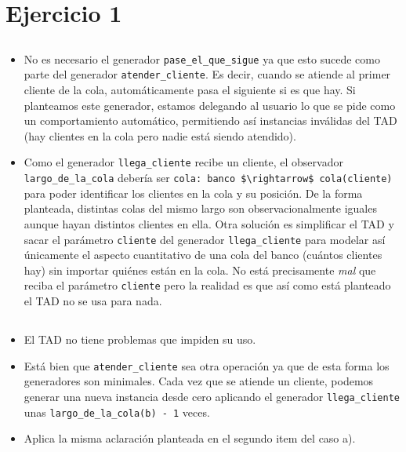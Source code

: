 \section{Ejercicio 1}

\subsection{}

\begin{itemize}
    \item No es necesario el generador \lstinline{pase_el_que_sigue} ya que esto sucede como parte del generador \lstinline{atender_cliente}. Es decir, cuando se atiende al primer cliente de la cola, automáticamente pasa el siguiente si es que hay. Si planteamos este generador, estamos delegando al usuario lo que se pide como un comportamiento automático, permitiendo así instancias inválidas del TAD (hay clientes en la cola pero nadie está siendo atendido).
    \item Como el generador \lstinline{llega_cliente} recibe un cliente, el observador \lstinline{largo_de_la_cola} debería ser \lstinline{cola: banco $\rightarrow$ cola(cliente)} para poder identificar los clientes en la cola y su posición. De la forma planteada, distintas colas del mismo largo son observacionalmente iguales aunque hayan distintos clientes en ella. Otra solución es simplificar el TAD y sacar el parámetro \lstinline{cliente} del generador \lstinline{llega_cliente} para modelar así únicamente el aspecto cuantitativo de una cola del banco (cuántos clientes hay) sin importar quiénes están en la cola. No está precisamente \emph{mal} que reciba el parámetro \lstinline{cliente} pero la realidad es que así como está planteado el TAD no se usa para nada.
\end{itemize}

\subsection{}

\begin{itemize}
    \item El TAD no tiene problemas que impiden su uso.
    \item Está bien que \lstinline{atender_cliente} sea otra operación ya que de esta forma los generadores son minimales. Cada vez que se atiende un cliente, podemos generar una nueva instancia desde cero aplicando el generador \lstinline{llega_cliente} unas \lstinline{largo_de_la_cola(b) - 1} veces.
    \item Aplica la misma aclaración planteada en el segundo item del caso a).
\end{itemize}

